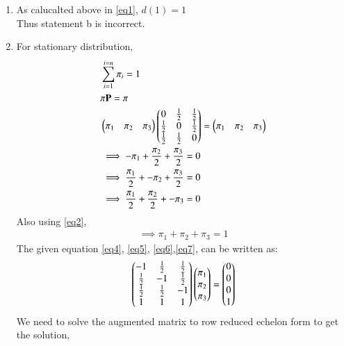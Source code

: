 \documentclass[journal,12pt,twocolumn]{IEEEtran}
\begin{document}
\begin{enumerate}
{    Thus statement a is correct}\\
    \item{As calucalted above in \ref{eq1}, $d(1)=1$\\
    Thus statement b is incorrect.}\\
    \item{For stationary distribution,
    \begin{align}
    &\sum_{i=1}^{i=n} \pi_i = 1 \label{eq2}\\
    &\pi   \mathbf{P} = \pi \label{eq3}\\
    &\begin{pmatrix}\pi_1&\pi_2&\pi_3\end{pmatrix}\begin{pmatrix}0&\frac{1}{2}&\frac{1}{2}\\\frac{1}{2}&0&\frac{1}{2}\\\frac{1}{2}&\frac{1}{2}&0\end{pmatrix}=\begin{pmatrix}\pi_1&\pi_2&\pi_3\end{pmatrix}\\   
   & \implies -\pi_1+\frac{\pi_2}{2}+\frac{\pi_3}{2}=0\label{eq4}\\
    &\implies \frac{\pi_1}{2}+-\pi_2+\frac{\pi_3}{2}=0\label{eq5}\\
    &\implies \frac{\pi_1}{2}+\frac{\pi_2}{2}+-\pi_3=0\label{eq6}
\end{align}
Also using  \ref{eq2},
\begin{align}    
    \implies \pi_1+\pi_2+\pi_3=1\label{eq7}
    \end{align}
    The given equation \ref{eq4}, \ref{eq5}, \ref{eq6},\ref{eq7}, can be written as:\\
    \begin{align}
    \begin{pmatrix}-1&\frac{1}{2}&\frac{1}{2}\\\frac{1}{2}&-1&\frac{1}{2}\\\frac{1}{2}&\frac{1}{2}&-1\\1&1&1\end{pmatrix}\begin{pmatrix}\pi_1\\\pi_2\\\pi_3\end{pmatrix}=\begin{pmatrix}0\\0\\0\\1\end{pmatrix}
    \end{align}
    We need to solve the augmented matrix to row reduced echelon form to get the solution,
    
}
\end{enumerate}
\end{document}
